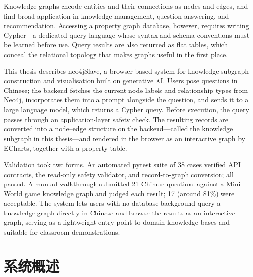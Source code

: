 \documentclass[12pt,a4paper]{article}
\begin{document}
{}
\begin{thesisabstracten}

Knowledge graphs encode entities and their connections as nodes and edges, and find broad application in knowledge management, question answering, and recommendation. Accessing a property graph database, however, requires writing Cypher---a dedicated query language whose syntax and schema conventions must be learned before use. Query results are also returned as flat tables, which conceal the relational topology that makes graphs useful in the first place.

This thesis describes neo4jSlave, a browser-based system for knowledge subgraph construction and visualisation built on generative AI. Users pose questions in Chinese; the backend fetches the current node labels and relationship types from Neo4j, incorporates them into a prompt alongside the question, and sends it to a large language model, which returns a Cypher query. Before execution, the query passes through an application-layer safety check. The resulting records are converted into a node--edge structure on the backend---called the knowledge subgraph in this thesis---and rendered in the browser as an interactive graph by ECharts, together with a property table.

Validation took two forms. An automated pytest suite of 38 cases verified API contracts, the read-only safety validator, and record-to-graph conversion; all passed. A manual walkthrough submitted 21 Chinese questions against a Mini World game knowledge graph and judged each result; 17 (around 81\%) were acceptable. The system lets users with no database background query a knowledge graph directly in Chinese and browse the results as an interactive graph, serving as a lightweight entry point to domain knowledge bases and suitable for classroom demonstrations.
\end{thesisabstracten}

\newpage

\pagestyle{thesistoc}
\tableofcontents
\newpage

\pagestyle{thesismain}
\setcounter{page}{1}

\section{系统概述}
\end{document}

